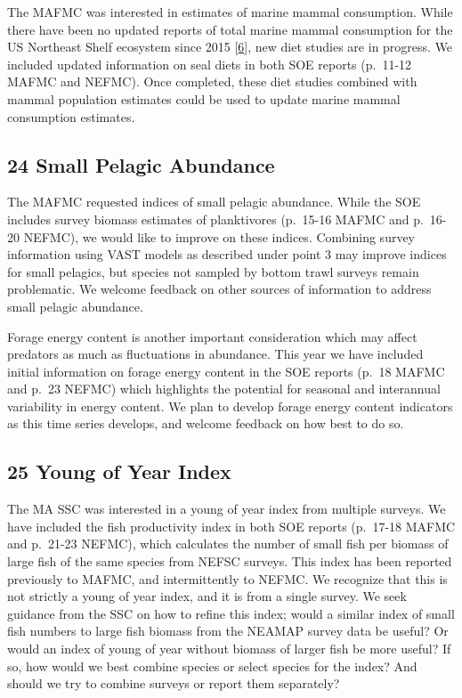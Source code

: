 \documentclass[
  10pt,
]{article}
\begin{document}
The MAFMC was interested in estimates of marine mammal consumption.
While there have been no updated reports of total marine mammal
consumption for the US Northeast Shelf ecosystem since 2015
{[}\protect\hyperlink{ref-smith_consumption_2015}{6}{]}, new diet
studies are in progress. We included updated information on seal diets
in both SOE reports (p.~11-12 MAFMC and NEFMC). Once completed, these
diet studies combined with mammal population estimates could be used to
update marine mammal consumption estimates.

\hypertarget{small-pelagic-abundance}{%
\subsection{24 Small Pelagic Abundance}\label{small-pelagic-abundance}}

The MAFMC requested indices of small pelagic abundance. While the SOE
includes survey biomass estimates of planktivores (p.~15-16 MAFMC and
p.~16-20 NEFMC), we would like to improve on these indices. Combining
survey information using VAST models as described under point 3 may
improve indices for small pelagics, but species not sampled by bottom
trawl surveys remain problematic. We welcome feedback on other sources
of information to address small pelagic abundance.

Forage energy content is another important consideration which may
affect predators as much as fluctuations in abundance. This year we have
included initial information on forage energy content in the SOE reports
(p.~18 MAFMC and p.~23 NEFMC) which highlights the potential for
seasonal and interannual variability in energy content. We plan to
develop forage energy content indicators as this time series develops,
and welcome feedback on how best to do so.

\hypertarget{young-of-year-index}{%
\subsection{25 Young of Year Index}\label{young-of-year-index}}

The MA SSC was interested in a young of year index from multiple
surveys. We have included the fish productivity index in both SOE
reports (p.~17-18 MAFMC and p.~21-23 NEFMC), which calculates the number
of small fish per biomass of large fish of the same species from NEFSC
surveys. This index has been reported previously to MAFMC, and
intermittently to NEFMC. We recognize that this is not strictly a young
of year index, and it is from a single survey. We seek guidance from the
SSC on how to refine this index; would a similar index of small fish
numbers to large fish biomass from the NEAMAP survey data be useful? Or
would an index of young of year without biomass of larger fish be more
useful? If so, how would we best combine species or select species for
the index? And should we try to combine surveys or report them
separately?
\end{document}
